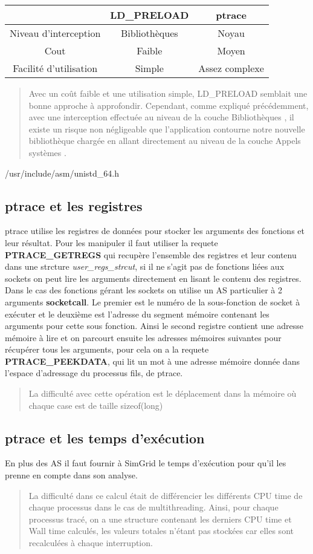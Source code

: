 \documentclass{article}
\begin{document}
\begin{tabular}{|c|c|c|}
\hline & LD\_PRELOAD & ptrace\\ \hline Niveau d'interception & Bibliothèques &
Noyau \\ \hline Cout & Faible & Moyen \\ \hline Facilité d'utilisation & Simple
& Assez complexe \\ \hline
\end{tabular}

\begin{quotation}
Avec un coût faible et une utilisation simple, LD\_PRELOAD semblait une bonne
approche à approfondir. Cependant, comme expliqué précédemment, avec une
interception effectuée au niveau de la couche Bibliothèques , il existe un
risque non négligeable que l’application contourne notre nouvelle bibliothèque
chargée en allant directement au niveau de la couche Appels systèmes .
\end{quotation}

/usr/include/asm/unistd\_64.h

\subsection{ptrace et les registres}
ptrace utilise les registres de données pour stocker les arguments des fonctions
et leur résultat. Pour les manipuler il faut utiliser la requete
\textbf{PTRACE\_GETREGS} qui recupère l'ensemble des registres et leur contenu
dans une strcture \textit{user\_regs\_strcut}, si il ne s'agit pas de fonctions
liées aux sockets on peut lire les arguments directement en lisant le contenu
des registres. Dans le cas des fonctions gérant les sockets on utilise un AS
particulier à 2 arguments \textbf{socketcall}. Le premier est le numéro de la
sous-fonction de socket à exécuter et le deuxième est l'adresse du segment
mémoire contenant les arguments pour cette sous fonction. Ainsi le second
registre contient une adresse mémoire à lire et on parcourt ensuite les adresses
mémoires suivantes pour récupérer tous les arguments, pour cela on a la requete
\textbf{PTRACE\_PEEKDATA}, qui lit un mot à une adresse mémoire donnée dans
l'espace d'adressage du processus fils, de ptrace.
\begin{quotation}
La difficulté avec cette opération est le déplacement dans la mémoire où chaque
case est de taille sizeof(long)
\end{quotation}

\subsection{ptrace et les temps d'exécution}
En plus des AS il faut fournir à SimGrid le temps d'exécution pour qu'il les
prenne en compte dans son analyse.
\begin{quotation}
La difficulté dans ce calcul était de différencier les différents CPU time de
chaque processus dans le cas de multithreading. Ainsi, pour chaque processus
tracé, on a une structure contenant les derniers CPU time et Wall time calculés,
les valeurs totales n’étant pas stockées car elles sont recalculées à chaque
interruption.
\end{quotation}
\end{document}
